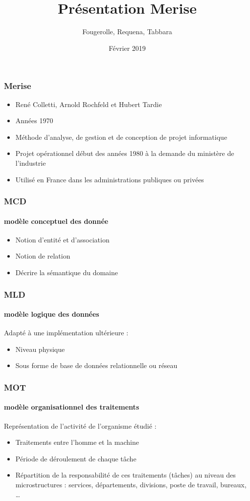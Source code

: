 \documentclass{beamer}
\title{Présentation Merise}
\author{Fougerolle, Requena, Tabbara}
\date{Février 2019}
\begin{document}
\maketitle
\begin{frame}
\frametitle{Merise}
\begin{itemize}
\item René Colletti, Arnold Rochfeld et Hubert Tardie
\item Années 1970
\item Méthode d'analyse, de gestion et de conception de projet informatique
\item Projet opérationnel début des années 1980 à la demande du ministère de l'industrie
\item Utilisé en France dans les administrations publiques ou privées
\end{itemize}
\end{frame}
\begin{frame}
\frametitle{MCD}
\framesubtitle{modèle conceptuel des donnée}
\begin{itemize}
\item Notion d'entité et d'association
\item Notion de relation
\item Décrire la sémantique du domaine
\end{itemize}
\end{frame}
\begin{frame}
\frametitle{MLD}
\framesubtitle{modèle logique des données}
Adapté à une implémentation ultérieure :
\begin{itemize}
\item Niveau physique
\item Sous forme de base de données relationnelle ou réseau
\end{itemize}
\end{frame}
\begin{frame}
\frametitle{MOT}
\framesubtitle{modèle organisationnel des traitements} 
Représentation de l'activité de l'organisme étudié :
\begin{itemize}
\item Traitements entre l'homme et la machine \item Période de déroulement de chaque tâche
\item Répartition de la responsabilité de ces traitements (tâches) au niveau des microstructures : services, départements, divisions, poste de travail, bureaux, …
\end{itemize}
\end{frame}
\end{document}
